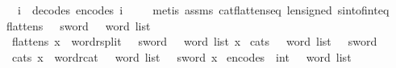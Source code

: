 \begin{isabellebody}
\ \ \ {\isachardoublequoteopen}i\ {\isacharequal}{\kern0pt}\ decode{\isacharunderscore}{\kern0pt}s{}{}\ {\isacharparenleft}{\kern0pt}encode{\isacharunderscore}{\kern0pt}s{}{}\ i{\isacharparenright}{\kern0pt}{\isachardoublequoteclose}\ \isanewline
%
\isadelimproof
\ \ %
\endisadelimproof
%
\isatagproof
{}\isamarkupfalse%
\ {\isacharparenleft}{\kern0pt}metis\ assms\ cat{\isacharunderscore}{\kern0pt}flatten{\isacharunderscore}{\kern0pt}s{}{}{\isacharunderscore}{\kern0pt}eq\ len{\isacharunderscore}{\kern0pt}signed\ sint{\isacharunderscore}{\kern0pt}of{\isacharunderscore}{\kern0pt}int{\isacharunderscore}{\kern0pt}eq{\isacharparenright}{\kern0pt}%
\endisatagproof
{\isafoldproof}%
%
\isadelimproof
\isanewline
%
\endisadelimproof
\isanewline
{}\isamarkupfalse%
\ flatten{\isacharunderscore}{\kern0pt}s{}{}\ {\isacharcolon}{\kern0pt}{\isacharcolon}{\kern0pt}\ {\isachardoublequoteopen}{}{}\ sword\ {\isasymRightarrow}\ {}\ word\ list{\isachardoublequoteclose}\isanewline
\ \ \isanewline
\ \ {\isachardoublequoteopen}flatten{\isacharunderscore}{\kern0pt}s{}{}\ x\ {\isasymequiv}\ {\isacharparenleft}{\kern0pt}word{\isacharunderscore}{\kern0pt}rsplit\ {\isacharcolon}{\kern0pt}{\isacharcolon}{\kern0pt}\ {}{}\ sword\ {\isasymRightarrow}\ {}\ word\ list{\isacharparenright}{\kern0pt}\ x{\isachardoublequoteclose}\isanewline
\isanewline
{}\isamarkupfalse%
\ cat{\isacharunderscore}{\kern0pt}s{}{}\ {\isacharcolon}{\kern0pt}{\isacharcolon}{\kern0pt}\ {\isachardoublequoteopen}{}\ word\ list\ {\isasymRightarrow}\ {}{}\ sword{\isachardoublequoteclose}\isanewline
\ \ \isanewline
\ \ {\isachardoublequoteopen}cat{\isacharunderscore}{\kern0pt}s{}{}\ x\ {\isasymequiv}\ {\isacharparenleft}{\kern0pt}word{\isacharunderscore}{\kern0pt}rcat\ {\isacharcolon}{\kern0pt}{\isacharcolon}{\kern0pt}\ {}\ word\ list\ {\isasymRightarrow}\ {}{}\ sword{\isacharparenright}{\kern0pt}\ x{\isachardoublequoteclose}\isanewline
\isanewline
{}\isamarkupfalse%
\ encode{\isacharunderscore}{\kern0pt}s{}{}\ {\isacharcolon}{\kern0pt}{\isacharcolon}{\kern0pt}\ {\isachardoublequoteopen}int\ {\isasymRightarrow}\ {}\ word\ list{\isachardoublequoteclose}\isanewline

\end{isabellebody}
